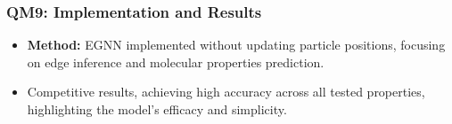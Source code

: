 \documentclass[11pt,xcolor={dvipsnames},hyperref={pdftex,pdfpagemode=UseNone,hidelinks,pdfdisplaydoctitle=true},usepdftitle=false]{beamer}
\begin{document}
\begin{frame}
\frametitle{QM9: Implementation and Results}
\begin{itemize}
    \item \textbf{Method:} EGNN implemented without updating particle positions, focusing on edge inference and molecular properties prediction.
    \item Competitive results, achieving high accuracy across all tested properties, highlighting the model's efficacy and simplicity.
\end{itemize}
\end{frame}
                                    
\end{document}
